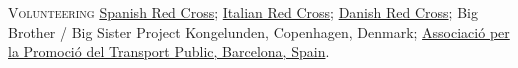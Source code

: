 \begin{paracol}{2}
  \textsc{Volunteering}
\switchcolumn
  \href{https://www.cruzroja.es/}{Spanish Red Cross};
  \href{https://www.cri.it}{Italian Red Cross};
  \href{https://www.rodekors.dk/}{Danish Red Cross};
  Big Brother / Big Sister Project Kongelunden, Copenhagen, Denmark;
  \href{https://transportpublic.org/}{Associació per la Promoció del Transport Public, Barcelona, Spain}.
\end{paracol}